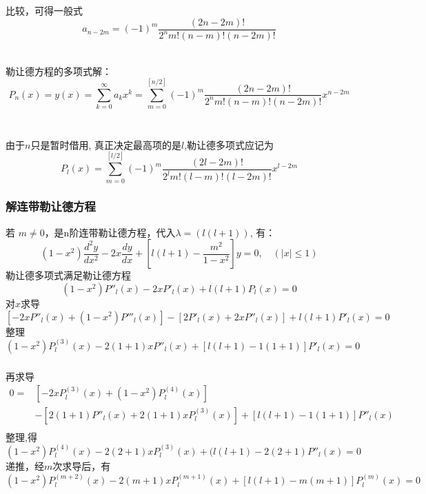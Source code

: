 \begin{frame}
比较，可得一般式
\begin{equation*}
  a_{n-2 m}=(-1)^{m} \frac{(2 n-2 m) !}{2^{n} m !(n-m) !(n-2 m) !}
\end{equation*}	

~~\\ 
勒让德方程的多项式解：
\begin{equation*}
  P_{n}(x) = y(x)=\sum_{k=0}^{\infty}a_k x^k =\sum_{m=0}^{[n / 2]}(-1)^{m} \frac{(2 n-2 m) !}{2^{n} m !(n-m) !(n-2 m) !} x^{n-2 m}
\end{equation*}	 
\end{frame}	

\begin{frame}[label=current]
\frametitle{}
由于$n$只是暂时借用, 真正决定最高项的是$l$,勒让德多项式应记为
\begin{equation*}
\boxed{P_{l}(x)=\sum_{m=0}^{[l / 2]}(-1)^{m} \frac{(2 l-2 m) !}{2^{l} m !(l-m) !(l-2 m) !} x^{l-2 m}} 
\end{equation*}
\end{frame} 

\begin{frame}[label=current]
\frametitle{解连带勒让德方程}
若 $m \ne 0$，是n阶连带勒让德方程，代入$\lambda = (l(l+1))$,  有：
\begin{equation*}
\left(1-x^{2}\right) \frac{d^{2} y}{d x^{2}}-2 x \frac{d y}{d x}+\left[l(l+1)-\frac{m^{2}}{1-x^{2}}\right] y=0, \quad (|x|\le 1) 
\end{equation*}
\解 勒让德多项式满足勒让德方程
\[\left(1-x^{2}\right) P'' _l  (x) -2 x P' _l (x)+l(l+1)P_l(x)=0\]
对$x$求导
\[\left[-2x P'' _l  (x) + \left(1-x^{2}\right) P''' _l  (x)\right] - \left[2 P' _l (x) +2 x P'' _l (x) \right] + l(l+1)P'_l(x)=0 \]
整理
\[\left(1-x^{2}\right) P^{(3)} _l (x) -2(1+1) x P'' _l (x)+\left[l(l+1)-1(1+1)\right]P'_l(x)=0	\]
\end{frame}	

\begin{frame}[label=current]
\frametitle{}
再求导
\[ \begin{aligned}
0=&\left[-2x P^{(3)}_l (x) + \left(1-x^{2}\right) P^{(4)} _l (x)\right] \\
&- \left[2(1+1) P'' _l (x) +2(1+1) x P^{(3)} _l (x)\right] + \left[l(l+1)-1(1+1) \right] P''_l(x)\\ 
\end{aligned}
\]
整理,得
\[\left(1-x^{2}\right) P^{(4)} _l  (x) -2(2+1) x P^{(3)} _l (x)+(l(l+1)-2(2+1)P''_l(x)=0\]
递推，经$m$次求导后，有
{\small \begin{equation}\label{eq:lege}
\left(1-x^{2}\right) P^{(m+2)} _l  (x) -2(m+1) x P^{(m+1)} _l (x)+\left[l(l+1)-m(m+1)\right]P^{(m)} _l(x)=0
\end{equation}}
\end{frame} 

